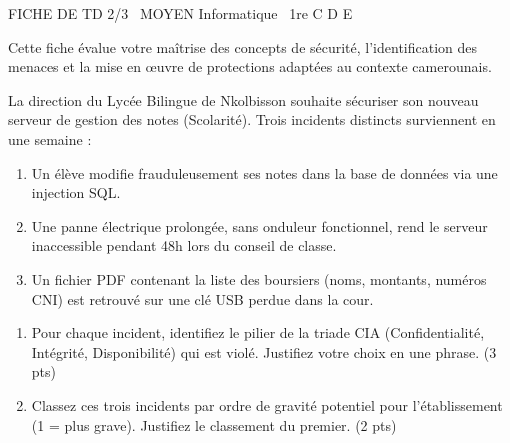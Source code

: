 \documentclass[11pt]{article}
\begin{document}
\begin{tcolorbox}[enhanced,colback=popink,colframe=popink,arc=10pt,boxrule=0pt,left=12pt,right=12pt,top=9pt,bottom=9pt]
{\color{white}\popxbold\small FICHE DE TD 2/3 \textbullet\ MOYEN \hfill Informatique \textbullet\ 1re C D E\par}
\end{tcolorbox}
\vspace{4pt}
Cette fiche évalue votre maîtrise des concepts de sécurité, l'identification des menaces et la mise en œuvre de protections adaptées au contexte camerounais.

\begin{exercice}
La direction du Lycée Bilingue de Nkolbisson souhaite sécuriser son nouveau serveur de gestion des notes (Scolarité). Trois incidents distincts surviennent en une semaine :
\begin{enumerate}
    \item Un élève modifie frauduleusement ses notes dans la base de données via une injection SQL.
    \item Une panne électrique prolongée, sans onduleur fonctionnel, rend le serveur inaccessible pendant 48h lors du conseil de classe.
    \item Un fichier PDF contenant la liste des boursiers (noms, montants, numéros CNI) est retrouvé sur une clé USB perdue dans la cour.
\end{enumerate}
\begin{enumerate}
    \item Pour chaque incident, identifiez le pilier de la triade CIA (Confidentialité, Intégrité, Disponibilité) qui est violé. Justifiez votre choix en une phrase. \hfill (3 pts)
    \item Classez ces trois incidents par ordre de gravité potentiel pour l'établissement (1 = plus grave). Justifiez le classement du premier. \hfill (2 pts)
\end{enumerate}
\end{exercice}
\end{document}
